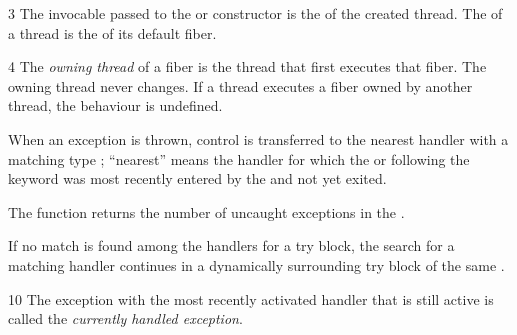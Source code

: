 3 The invocable passed to the  or 
constructor  is the \entryfn of the created thread.
The \entryfn of a thread is the \entryfn of its default fiber.

4 The \emph{owning thread} of a fiber is the thread that first executes that
fiber. The owning thread never changes.
If a thread executes a fiber owned by another thread, the behaviour is
undefined.
\cbend


When an exception is thrown, control is transferred to the nearest handler
with a matching type ; ``nearest'' means the handler for
which the  or
 following the  keyword was
most recently entered by the  and
not yet exited.




The function 
returns the number of uncaught exceptions in the
.


If no match is found among the handlers for a try block, the search for a
matching handler continues in a dynamically surrounding try block of the same
.


10 The exception with the most recently activated handler
 that is still active is called the
\emph{currently handled exception}.


